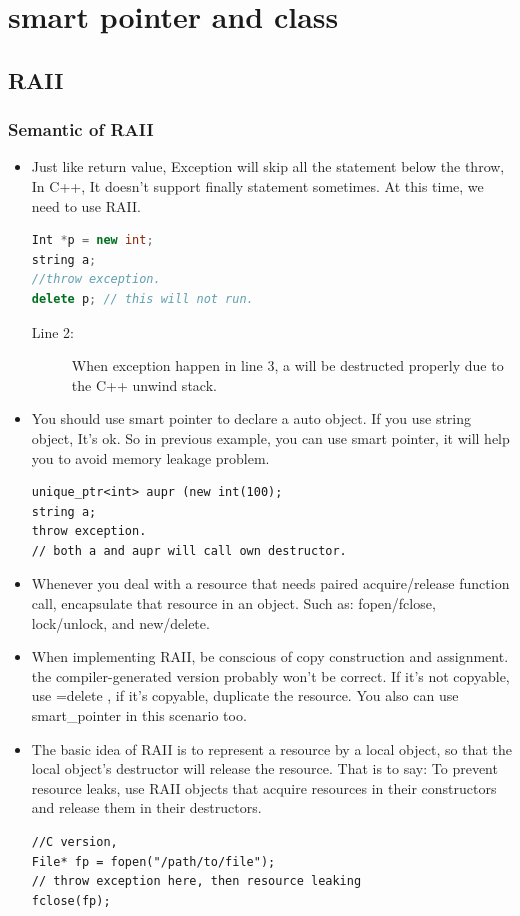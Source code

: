 \documentclass[a4paper,11pt,twoside]{book}
\begin{document}
\section{smart pointer and class}
\subsection{RAII}
\subsubsection{Semantic of RAII}
\begin{itemize}
		\item Just like return value,  Exception will skip all the statement below the throw, In C++, It doesn't support finally statement sometimes. At this time, we need to use RAII.
\begin{lstlisting}[frame=single, language=c++]
Int *p = new int;
string a;   
//throw exception.
delete p; // this will not run.
\end{lstlisting}
	\begin{description}
		\item[Line 2:] When exception happen in line 3, a will be destructed properly due to the C++ unwind stack.
	\end{description}
	
		\item You should use smart pointer to declare a auto object.  If you use string object, It's ok.  So in previous example,  you can use smart pointer, it will help you to avoid memory leakage problem.
\begin{lstlisting}[numbers=none]
unique_ptr<int> aupr (new int(100);
string a;
throw exception.
// both a and aupr will call own destructor.
\end{lstlisting}
	
	\item Whenever you deal with a resource that needs paired acquire/release function call, encapsulate that resource in an object.  Such as: fopen/fclose, lock/unlock, and new/delete.
	
	\item When implementing RAII, be conscious of copy construction and assignment. the compiler-generated version probably won't be correct. If it's not copyable, use =delete , if it's copyable, duplicate the resource.  You also can use smart\_pointer in this scenario too.
	
	\item The basic idea of RAII  is to represent a resource by a local object, so that the local object's destructor will release the resource.  That is to say: To prevent resource leaks, use RAII objects that acquire resources in their constructors and release them in their destructors.
\begin{lstlisting}[numbers = none]
//C version,
File* fp = fopen("/path/to/file");
// throw exception here, then resource leaking
fclose(fp);
	

\end{lstlisting}
\end{itemize}
\end{document}
